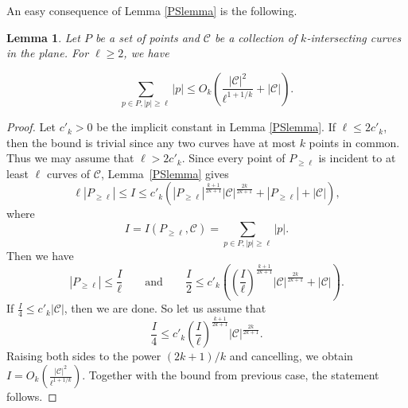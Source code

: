 \documentclass[11pt]{article}
\theoremstyle{plain}
\newtheorem{lemma}[theorem]{Lemma}
\theoremstyle{definition}
\theoremstyle{remark}
\begin{document}
 

        


\noindent An easy consequence of Lemma \ref{PSlemma} is the following.   





\begin{lemma}\label{smalldeg}
Let $P$ be a set of points and $\mathcal C$ be a collection of $k$-intersecting curves in the plane. For $\ell \ge 2$,  we have


$$\sum\limits_{p\in P, |p| \geq \ell}|p| \leq  O_k\!\left(
\frac{|\mathcal C|^2}{\ell^{1+1/k}}
+
|\mathcal C|
\right).$$



 
\end{lemma}

\begin{proof} 
Let $c'_k > 0$ be the implicit constant in Lemma \ref{PSlemma}.  If \(\ell\le 2c'_k\), then the bound is trivial since any two curves have at most $k$ points in common.   Thus we may assume that \(\ell>2c'_k\).
Since every point of \(P_{\ge \ell}\) is incident to at least \(\ell\) curves of \(\mathcal C\), Lemma~\ref{PSlemma} gives
\[
\ell |P_{\ge \ell}|
\le
I
\le
c'_k\!\left(
|P_{\ge \ell}|^{\frac{k+1}{2k+1}}|\mathcal C|^{\frac{2k}{2k+1}}
+
|P_{\ge \ell}|
+
|\mathcal C|
\right),
\]
where 
\[
I=I(P_{\ge \ell},\mathcal C)=\sum\limits_{p\in P, |p| \geq \ell}|p|. 
\] 
Then we have
\[
|P_{\ge \ell}| \leq \frac{I}{\ell}
\qquad\text{and}\qquad
\frac{I}{2} \leq c'_k\!\left(
(\frac{I}{\ell})^{\frac{k+1}{2k+1}}|\mathcal C|^{\frac{2k}{2k+1}}
+
|\mathcal C|
\right). 
\]
If $\frac{I}{4} \le c'_k|\mathcal C|$, then we are done. So let us assume that 
\[
\frac{I}{4} \leq c'_k (\frac{I}{\ell})^{\frac{k+1}{2k+1}}|\mathcal C|^{\frac{2k}{2k+1}}. 
\]
Raising both sides to the power \((2k+1)/k\) and cancelling, we obtain $I = O_k\!\left(\frac{|\mathcal C|^2}{\ell^{1+1/k}}\right).$ Together with the bound from previous case, the statement follows.
\end{proof}
\end{document}
